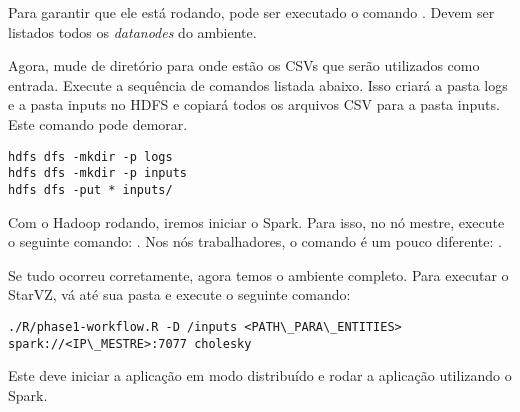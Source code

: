 Para garantir que ele está rodando, pode ser executado o comando . Devem ser listados todos os \emph{datanodes} do ambiente.

Agora, mude de diretório para onde estão os CSVs que serão utilizados como 
entrada. Execute a sequência de comandos listada abaixo. Isso criará a pasta 
logs e a pasta inputs no HDFS e copiará todos os arquivos CSV para a pasta 
inputs. Este comando pode demorar.

\small
\begin{lstlisting}
hdfs dfs -mkdir -p logs
hdfs dfs -mkdir -p inputs
hdfs dfs -put * inputs/
\end{lstlisting}


Com o Hadoop rodando, iremos iniciar o Spark. Para isso, no nó mestre, execute 
o seguinte comando: . Nos nós trabalhadores, o 
comando é um pouco diferente: .

Se tudo ocorreu corretamente, agora temos o ambiente completo. Para executar o 
StarVZ, vá até sua pasta e execute o seguinte comando: 

\small
\begin{lstlisting}
./R/phase1-workflow.R -D /inputs <PATH\_PARA\_ENTITIES> 
spark://<IP\_MESTRE>:7077 cholesky
\end{lstlisting}
\normalsize

Este deve iniciar a aplicação em modo distribuído e rodar a aplicação 
utilizando o Spark.
